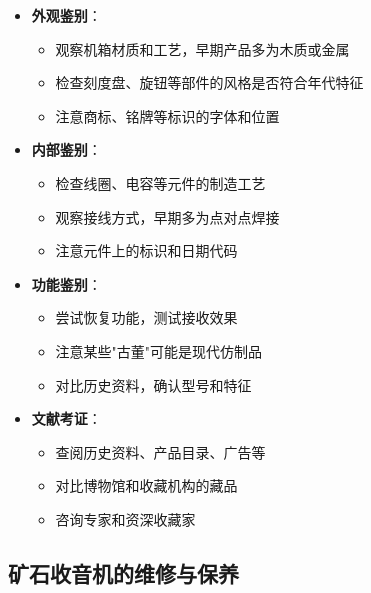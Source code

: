 \documentclass[12pt,UTF8]{ctexbook}
\begin{document}
\begin{itemize}[leftmargin=3.5em]
    \item \textbf{外观鉴别}：
        \begin{itemize}[leftmargin=3.5em]
            \item 观察机箱材质和工艺，早期产品多为木质或金属
            \item 检查刻度盘、旋钮等部件的风格是否符合年代特征
            \item 注意商标、铭牌等标识的字体和位置
        \end{itemize}
    \item \textbf{内部鉴别}：
        \begin{itemize}[leftmargin=3.5em]
            \item 检查线圈、电容等元件的制造工艺
            \item 观察接线方式，早期多为点对点焊接
            \item 注意元件上的标识和日期代码
        \end{itemize}
    \item \textbf{功能鉴别}：
        \begin{itemize}[leftmargin=3.5em]
            \item 尝试恢复功能，测试接收效果
            \item 注意某些"古董"可能是现代仿制品
            \item 对比历史资料，确认型号和特征
        \end{itemize}
    \item \textbf{文献考证}：
        \begin{itemize}[leftmargin=3.5em]
            \item 查阅历史资料、产品目录、广告等
            \item 对比博物馆和收藏机构的藏品
            \item 咨询专家和资深收藏家
        \end{itemize}
\end{itemize}

\subsection{矿石收音机的维修与保养}
\end{document}
